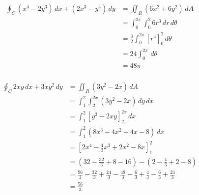 \documentclass{article}
\begin{document}
\begin{align*}
  \oint_C (x^4 - 2 y^3) \,dx + (2 x^3 - y^4) \,dy & = \iint_R (6 x^2 + 6 y^2) \,dA                    \\
                                                  & = \int_0^{2 \pi} \int_0^2 6 r^3 \,dr \,d \theta   \\
                                                  & = \frac{3}{2} \int_0^{2 \pi} [r^4]_0^2 \,d \theta \\
                                                  & = 24 \int_0^{2 \pi} \,d \theta                    \\
                                                  & = 48 \pi
\end{align*}

\setcounter{subsubsection}{8}
\subsubsection{}

\begin{align*}
  \oint_C 2 x y \,dx + 3 x y^2 \,dy & = \iint_R (3 y^2 - 2 x) \,dA                                                                                         \\
                                    & = \int_1^2 \int_2^{2 x} (3 y^2 - 2 x) \,dy \,dx                                                                      \\
                                    & = \int_1^2 [y^3 - 2 x y]_2^{2 x} \,dx                                                                                \\
                                    & = \int_1^2 (8 x^3 - 4 x^2 + 4 x - 8) \,dx                                                                            \\
                                    & = \left[ 2 x^4 - \frac{4}{3} x^3 + 2 x^2 - 8 x \right]_1^2                                                           \\
                                    & = \left( 32 - \frac{32}{3} + 8 - 16 \right) - \left( 2 - \frac{4}{3} + 2 - 8 \right)                                 \\
                                    & = \frac{96}{3} - \frac{32}{3} + \frac{24}{3} - \frac{48}{3} - \frac{6}{3} + \frac{4}{3} - \frac{6}{3} + \frac{24}{3} \\
                                    & = \frac{56}{3}
\end{align*}
\end{document}
